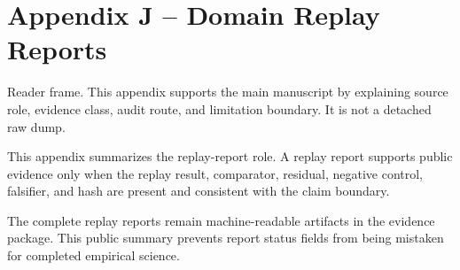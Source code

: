 \section{Appendix J -- Domain Replay Reports}
Reader frame. This appendix supports the main manuscript by explaining source role, evidence class, audit route, and limitation boundary. It is not a detached raw dump.


\label{sec:oc-core-1-3-domain-replay-report-summary}

This appendix summarizes the replay-report role. A replay report supports public evidence only when the replay result, comparator, residual, negative control, falsifier, and hash are present and consistent with the claim boundary.


The complete replay reports remain machine-readable artifacts in the evidence package. This public summary prevents report status fields from being mistaken for completed empirical science.
